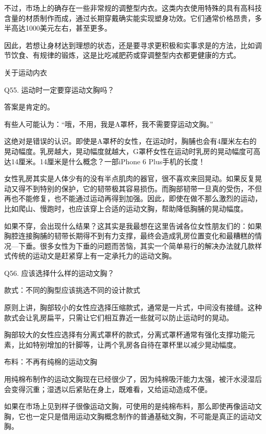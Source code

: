 \documentclass[12pt,UTF8]{ctexbook}
\begin{document}
不过，市场上的确存在一些非常规的调整型内衣。这类内衣使用特殊的具有高科技含量的材质制作而成，通过长期穿戴确实能实现塑身功效。它们通常价格昂贵，多半高达1000美元左右，甚至更多。

因此，若想让身材达到理想的状态，还是要寻求更积极和实事求是的方法，比如调节饮食、有规律的锻炼，这是比吃减肥药或穿调整型内衣都更健康的方式。





关于运动内衣


Q55. 运动时一定要穿运动文胸吗？


答案是肯定的。

有些人可能认为：“哦，不用，我是A罩杯，我不需要穿运动文胸。”

这绝对是错误的认识。即使是A罩杯的女性，在运动时，胸脯也会有4厘米左右的晃动幅度。乳房越大，晃动幅度就越大，G罩杯女性在运动时乳房的晃动幅度可高达14厘米。14厘米是什么概念？一部iPhone 6 Plus手机的长度！

女性乳房其实是人体少有的没有半点肌肉的器官，很不喜欢来回晃动。如果反复晃动又得不到特别的保护，它的韧带极其容易损伤。而胸部韧带一旦真的受伤，不但再也不能修复，也不能通过运动再得到加强。因此，即使在做不那么激烈的运动，比如爬山、慢跑时，也应该穿上合适的运动文胸，帮助降低胸脯的晃动幅度。

如果不穿，会出现什么结果？这其实是我最想在这里告诫各位女性朋友们的：如果胸腔连接胸脯的韧带长期得不到有力支撑，最终会造成乳房位置变化和最糟糕的情况—下垂。很多女性为下垂的问题而苦恼，其实一个简单易行的解决办法就几款样式传统的运动文是赶紧穿上有一定承托力的运动文胸。





Q56. 应该选择什么样的运动文胸？




款式：不同的胸型应该挑选不同的设计款式

原则上讲，胸部较小的女性应选择压缩款式，通常是一片式，中间没有接缝。这种款式会让乳房扁平，只需让它们相互靠近一些就可以防止运动时的晃动。

胸部较大的女性应选择有分离式罩杯的款式，分离式罩杯通常有强化支撑功能元素，比如特别增加的针脚等，让两个乳房各自待在罩杯里以减少晃动幅度。

布料：不再有纯棉的运动文胸

用纯棉布制作的运动文胸现在已经很少了，因为纯棉吸汗能力太强，被汗水浸湿后会变得沉重；湿透以后紧贴在身上，既难看，又给运动造成不便。

如果在市场上见到样子很像运动文胸，可使用的是纯棉布料，那么即使再像运动文胸，它也一定只是借用运动文胸概念制作的普通基础文胸，不可能是真正的运动文胸。
\end{document}
